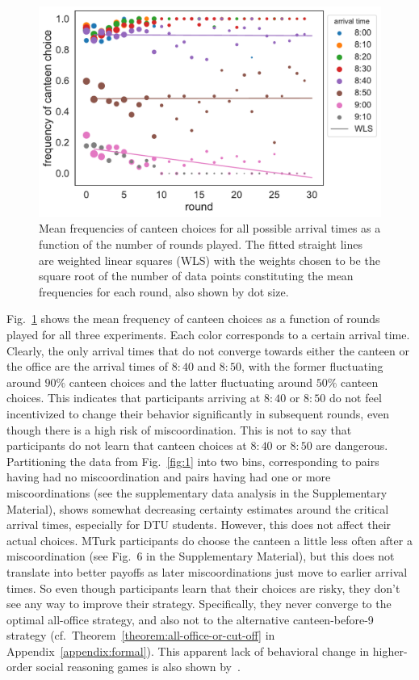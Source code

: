 \documentclass[twocolumn,a4paper,superscriptaddress,nofootinbib]{revtex4}
\begin{document}
\begin{figure} %
\centering\includegraphics[width=0.8\linewidth]{fig4_timeseries}
\caption{Mean frequencies of canteen choices for all possible arrival times as a function of the number of rounds played. The fitted straight lines are weighted linear squares (WLS) with the weights chosen to be the square root of the number of data points constituting the mean frequencies for each round, also shown by dot size.}
\label{timeseries}
\end{figure}
Fig.~\ref{timeseries} shows the mean frequency of canteen choices as a function of rounds played for all three experiments. Each color corresponds to a certain arrival time. Clearly, the only arrival times that do not converge towards either the canteen or the office are the arrival times of $8{:}40$ and $8{:}50$, with the former fluctuating around $90\%$ canteen choices and the latter fluctuating around $50\%$ canteen choices. This indicates that participants arriving at $8{:}40$ or $8{:}50$ do not feel incentivized to change their behavior significantly in subsequent rounds, even though there is a high risk of miscoordination. This is not to say that participants do not learn that canteen choices at $8{:}40$ or $8{:}50$ are dangerous. Partitioning the data from Fig.~\ref{fig:1} into two bins, corresponding to pairs having had no miscoordination and pairs having had one or more miscoordinations (see the supplementary data analysis in the Supplementary Material), shows somewhat decreasing certainty estimates around the critical arrival times, especially for DTU students. However, this does not affect their actual choices. MTurk participants do choose the canteen a little less often after a miscoordination (see Fig.~6 in the Supplementary Material), but this does not translate into better payoffs as later miscoordinations just move to earlier arrival times. So even though participants learn that their choices are risky, they don't see any way to improve their strategy. Specifically, they never converge to the optimal all-office strategy, and also not to the alternative canteen-before-9 strategy (cf.\ Theorem~\ref{theorem:all-office-or-cut-off} in Appendix~\ref{appendix:formal}). This apparent lack of behavioral change in higher-order social reasoning games is also shown by~\citet{verbrugge2008learning}. 
\end{document}
